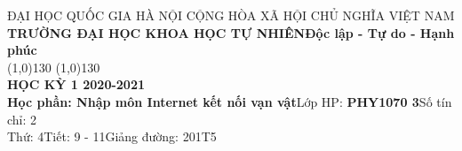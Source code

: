 \documentclass[14pt,a4paper]{article}
\newcommand\tab[1][1cm]{\hspace*{#1}} %
\begin{document}
\newcommand{\xfill}[2][1ex]{{%
		\dimen0=#2\advance\dimen0 by #1
		\leaders\hrule height \dimen0 depth -#1\hfill%
}}
\tab[3cm] ĐẠI HỌC QUỐC GIA HÀ NỘI \tab[5cm] CỘNG HÒA XÃ HỘI CHỦ NGHĨA VIỆT NAM\\
\tab[1.5cm]\textbf{TRƯỜNG ĐẠI HỌC KHOA HỌC TỰ NHIÊN\tab[5cm]Độc lập - Tự do - Hạnh phúc}\\	
\tab[3cm]\line (1,0){130} \tab[6cm] \line (1,0){130} \\\vspace{0.2cm}
\doublespacing\tab[8.5cm]\textbf{{\large HỌC KỲ 1 2020-2021}}\\
\textbf{Học phần: Nhập môn Internet kết nối vạn vật}\tab[3cm]Lớp HP: \textbf{PHY1070 3}\tab[2cm]Số tín chỉ: 2\\
Thứ: 4\tab[9.1cm]Tiết: 9 - 11\tab[3.45cm]Giảng đường: 201T5\\
\end{document}
